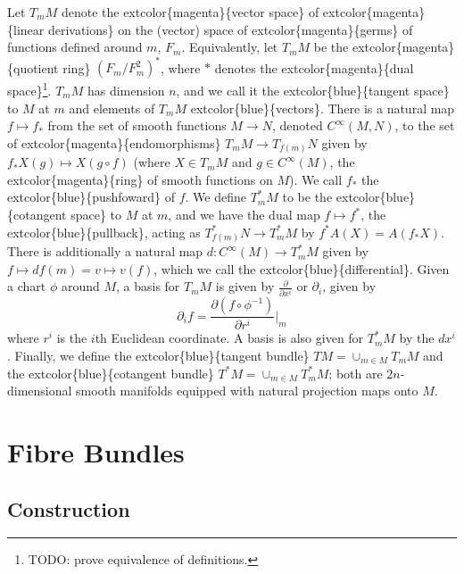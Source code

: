 \documentclass[
]{book}
\begin{document}
Let \(T_m M\) denote the extcolor\{magenta\}\{vector space\} of extcolor\{magenta\}\{linear derivations\} on the (vector) space of extcolor\{magenta\}\{germs\} of functions defined around \(m\), \(F_m\).
Equivalently, let \(T_m M\) be the extcolor\{magenta\}\{quotient ring\} \((F_m/F_m^2)^*\), where \(*\) denotes the extcolor\{magenta\}\{dual space\}\footnote{TODO: prove equivalence of definitions.}.
\(T_m M\) has dimension \(n\), and we call it the extcolor\{blue\}\{tangent space\} to \(M\) at \(m\) and elements of \(T_m M\) extcolor\{blue\}\{vectors\}. There is a natural map \(f \mapsto f_*\) from the set of smooth functions \(M \to N\), denoted \(C^\infty(M,N)\), to the set of extcolor\{magenta\}\{endomorphisms\} \(T_m M \to T_{f(m)} N\) given by \(f_* X(g) \mapsto X(g \circ f)\) (where \(X \in T_m M\) and \(g \in C^\infty(M)\), the extcolor\{magenta\}\{ring\} of smooth functions on \(M\)).
We call \(f_*\) the extcolor\{blue\}\{pushfoward\} of \(f\).
We define \(T_m^* M\) to be the extcolor\{blue\}\{cotangent space\} to \(M\) at \(m\), and we have the dual map \(f \mapsto f^*\), the extcolor\{blue\}\{pullback\}, acting as \(T_{f(m)}^* N \to T_m^* M\) by \(f^* A(X) = A(f_* X)\).
There is additionally a natural map \(d : C^\infty(M) \to T_m^* M\) given by \(f \mapsto df(m) = v \mapsto v(f)\), which we call the extcolor\{blue\}\{differential\}. Given a chart \(\phi\) around \(M\), a basis for \(T_m M\) is given by \(\frac{\partial}{\partial x^i}\) or \(\partial_{i}\), given by \begin{equation}     
    \partial_{i}f = \frac{\partial (f \circ \phi^{-1})}{\partial r^i}\Big|_m 
\end{equation} where \(r^i\) is the \(i\)th Euclidean coordinate.
A basis is also given for \(T^*_m M\) by the \(dx^i\).
Finally, we define the extcolor\{blue\}\{tangent bundle\} \(TM = \cup_{m\in M} T_m M\) and the extcolor\{blue\}\{cotangent bundle\} \(T^*M = \cup_{m\in M} T_m^* M\); both are \(2n\)-dimensional smooth manifolds equipped with natural projection maps onto \(M\).

\hypertarget{fibre-bundles}{%
\chapter{Fibre Bundles}\label{fibre-bundles}}

\hypertarget{construction-1}{%
\section{Construction}\label{construction-1}}
\end{document}
